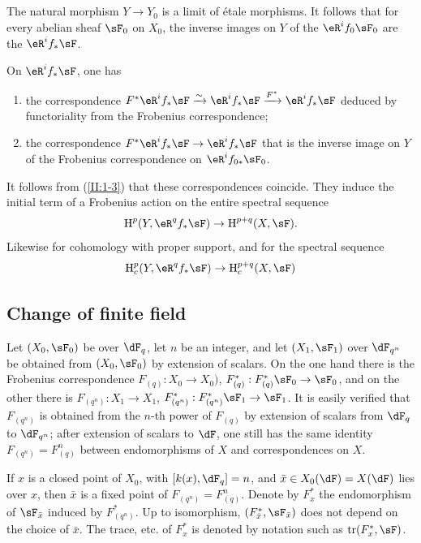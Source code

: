 \subsection{}\label{II:1-4}

The natural morphism $Y\to Y_0$ is a limit of étale morphisms. It follows
that for every abelian sheaf $\sF_0$ on $X_0$, the inverse images on $Y$ of
the $\eR^if_0\sF_0$ are the $\eR^if_*\sF$.

On $\eR^if_*\sF$, one has
\begin{enumerate}[\indent a)]
  \item the correspondence
    $F^*\eR^i f_*\sF \iso \eR^i f_*\sF \xrightarrow{F^*} \eR^if_*\sF$
    deduced by functoriality from the Frobenius correspondence;
  \item the correspondence $F^*\eR^if_*\sF\to\eR^if_*\sF$ that is the
    inverse image on $Y$ of the Frobenius correspondence on
    $\eR^i f_{0*}\sF_0$.
\end{enumerate}

It follows from (\ref{II:1-3}) that these correspondences coincide. They
induce the initial term of a Frobenius action on the entire spectral sequence
\[
  \h^p(Y,\eR^q f_*\sF) \rightarrow \h^{p+q}(X,\sF) \text{.}
\]
Likewise for cohomology with proper support, and for the spectral sequence
\[
  \h_c^p(Y,\eR^q f_* \sF) \rightarrow \h_c^{p+q}(X,\sF)
\]





\subsection{Change of finite field}\label{II:1-5}

Let $(X_0,\sF_0)$ be over $\dF_q$, let $n$ be an integer, and let
$(X_1,\sF_1)$ over $\dF_{q^n}$ be obtained from $(X_0,\sF_0)$ by extension of
scalars. On the one hand there is the Frobenius correspondence
$F_{(q)}:X_0\to X_0)$, $F_{(q)}^*:F_{(q)}^*\sF_0\to \sF_0$, and on the other
there is $F_{(q^n)}:X_1\to X_1$,
$F_{(q^n)}^*:F_{(q^n)}^*\sF_1\to\sF_1$. It is easily verified that
$F_{(q^n)}$ is obtained from the $n$-th power of $F_{(q)}$ by extension of
scalars from $\dF_q$ to $\dF_{q^n}$; after extension of scalars to $\dF$, one
still has the same identity $F_{(q^n)}=F_{(q)}^n$ between endomorphisms of
$X$ and correspondences on $X$.

If $x$ is a closed point of $X_0$, with $[k(x),\dF_q]=n$, and
$\bar x\in X_0(\dF) = X(\dF)$ lies over $x$, then $\bar x$ is a fixed point
of $F_{(q^n)}=F_{(q)}^n$. Denote by $F_x^*$ the endomorphism of
$\sF_{\bar x}$ induced by $F_{(q^n)}^*$. Up to isomorphism,
$(F_{\bar x}^*,\sF_{\bar x})$ does not depend on the choice of $\bar x$.
The trace, etc. of $F_x^*$ is denoted by notation such as
$\tr(F_x^*,\sF)$.






